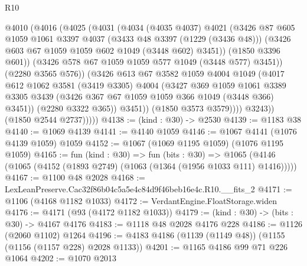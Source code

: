 \begin{lexlean}{R10}
\begin{coremodule}
                    @4010
                      (@4016
                        (@4025
                          (@4031
                            (@4034
                              (@4035 @4037)
                              @4021
                              (@3426
                                @87
                                @605
                                @1059
                                @1061
                                @3397
                                @4037
                                (@3433 @48 @3397 (@1229 (@3436 @48)))
                                (@3426 @603 @67 @1059 @1059 @602 @1049 (@3448 @602) @3451))
                              (@1850 @3396 @601))
                            (@3426 @578 @67 @1059 @1059 @577 @1049 (@3448 @577) @3451))
                          (@2280 @3565 @576))
                        (@3426
                          @613
                          @67
                          @3582
                          @1059
                          @4004
                          @1049
                          (@4017
                            @612
                            @1062
                            @3581
                            (@3419 @3305)
                            @4004
                            (@3427
                              @369
                              @1059
                              @1061
                              @3389
                              @3305
                              @3439
                              (@3426 @367 @67 @1059 @1059 @366 @1049 (@3448 @366) @3451))
                            (@2280 @3322 @365))
                          @3451))
                      (@1850 @3573 @3579))))
                @3243))
            (@1850 @2544 @2737)))))
@4138 := (kind : @30) -> @2530
@4139 := @1183 @38
@4140 := @1069 @4139
@4141 := @4140 @1059
@4146 := @1067 @4141 (@1076 @4139 @1059) @1059
@4152 := @1067 (@1069 @1195 @1059) (@1076 @1195 @1059)
@4165 := fun (kind : @30) =>
  fun (bits : @30) =>
  @1065 (@4146 (@1065 (@4152 (@1893 @2749) (@1063 (@1364 (@1956 @1033 @111) @1416)))))
@4167 := @1100 @48 @2028
@4168 := LexLeanPreserve.Cac32f86b04c5a5e4c84d9f46beb16e4c.R10.__fits_2
@4171 := @1106 (@4168 @1182 @1033)
@4172 := VerdantEngine.FloatStorage.widen
@4176 := @4171 (@93 (@4172 @1182 @1033))
@4179 := (kind : @30) -> (bits : @30) -> @4167 @4176
@4183 := @1118 @48 @2028 @4176 @228
@4186 := @1126 (@2060 @1102) @1264
@4196 := @4183 @4186 (@1139 (@1149 @48)) (@1155 (@1156 (@1157 @228) @2028 @1133))
@4201 := @1165 @4186 @99 @71 @226 @1064
@4202 := @1070 @2013

\end{coremodule}
\end{lexlean}
